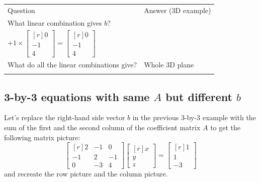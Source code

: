 \documentclass[../main.tex]{subfiles}
\begin{document}
\begin{tabular}{@{}ll@{}} \trule
    \textrm{Question}                         & \textrm{Answer (3D example)} \\ \mrule
    What linear combination gives $b$?        & \makecell[tl]{
        $
            0 \times
            \begin{bmatrix*}[r]
                2 \\
                -1 \\
                0
            \end{bmatrix*}
            +
            0 \times
            \begin{bmatrix*}[r]
                -1 \\
                2 \\
                -3
            \end{bmatrix*}
        $
        \\
        $
            + 1 \times
            \begin{bmatrix*}[r]
                0 \\
                -1 \\
                4
            \end{bmatrix*}
            =
            \begin{bmatrix*}[r]
                0 \\
                -1 \\
                4
            \end{bmatrix*}
        $
    }                                                                        \\
    What do all the linear combinations give? & Whole 3D plane               \\ \brule
\end{tabular}

\subsection{3-by-3 equations with same $A$ but different $b$}
Let's replace the right-hand side vector $b$ in the previous 3-by-3 example with the sum of the first and the second column of the coefficient matrix $A$ to get the following matrix picture:
\[
    \begin{bmatrix*}[r]
        2 & -1 & 0 \\
        -1 & 2 & -1 \\
        0 & -3 & 4
    \end{bmatrix*}
    \begin{bmatrix*}[r]
        x \\
        y \\
        z
    \end{bmatrix*}
    =
    \begin{bmatrix*}[r]
        1 \\
        1 \\
        -3
    \end{bmatrix*}
\]
and recreate the row picture and the column picture.
\end{document}
